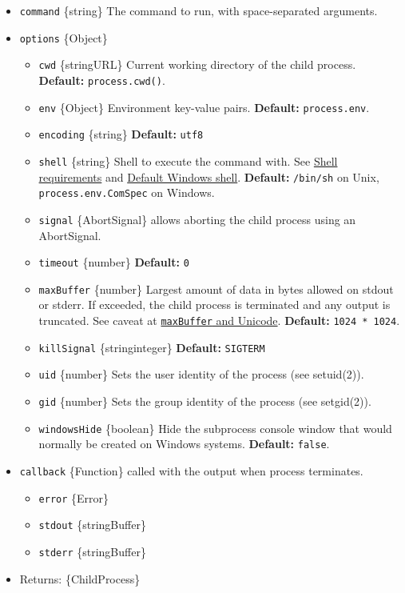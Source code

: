 \begin{itemize}
\tightlist
\item
  \texttt{command} \{string\} The command to run, with space-separated
  arguments.
\item
  \texttt{options} \{Object\}

  \begin{itemize}
  \tightlist
  \item
    \texttt{cwd} \{string\textbar URL\} Current working directory of the
    child process. \textbf{Default:} \texttt{process.cwd()}.
  \item
    \texttt{env} \{Object\} Environment key-value pairs.
    \textbf{Default:} \texttt{process.env}.
  \item
    \texttt{encoding} \{string\} \textbf{Default:}
    \texttt{\textquotesingle{}utf8\textquotesingle{}}
  \item
    \texttt{shell} \{string\} Shell to execute the command with. See
    \hyperref[shell-requirements]{Shell requirements} and
    \hyperref[default-windows-shell]{Default Windows shell}.
    \textbf{Default:}
    \texttt{\textquotesingle{}/bin/sh\textquotesingle{}} on Unix,
    \texttt{process.env.ComSpec} on Windows.
  \item
    \texttt{signal} \{AbortSignal\} allows aborting the child process
    using an AbortSignal.
  \item
    \texttt{timeout} \{number\} \textbf{Default:} \texttt{0}
  \item
    \texttt{maxBuffer} \{number\} Largest amount of data in bytes
    allowed on stdout or stderr. If exceeded, the child process is
    terminated and any output is truncated. See caveat at
    \hyperref[maxbuffer-and-unicode]{\texttt{maxBuffer} and Unicode}.
    \textbf{Default:} \texttt{1024\ *\ 1024}.
  \item
    \texttt{killSignal} \{string\textbar integer\} \textbf{Default:}
    \texttt{\textquotesingle{}SIGTERM\textquotesingle{}}
  \item
    \texttt{uid} \{number\} Sets the user identity of the process (see
    setuid(2)).
  \item
    \texttt{gid} \{number\} Sets the group identity of the process (see
    setgid(2)).
  \item
    \texttt{windowsHide} \{boolean\} Hide the subprocess console window
    that would normally be created on Windows systems. \textbf{Default:}
    \texttt{false}.
  \end{itemize}
\item
  \texttt{callback} \{Function\} called with the output when process
  terminates.

  \begin{itemize}
  \tightlist
  \item
    \texttt{error} \{Error\}
  \item
    \texttt{stdout} \{string\textbar Buffer\}
  \item
    \texttt{stderr} \{string\textbar Buffer\}
  \end{itemize}
\item
  Returns: \{ChildProcess\}
\end{itemize}

